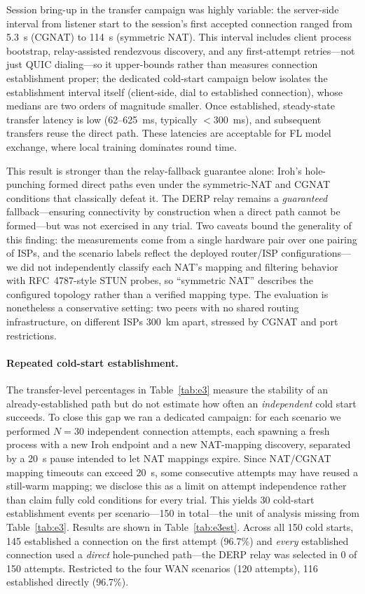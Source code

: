 ﻿\documentclass[journal]{IEEEtran}
\begin{document}
Session bring-up in the transfer campaign was highly variable: the server-side interval from listener start to the session's first accepted connection ranged from 5.3~s (CGNAT) to 114~s (symmetric NAT). This interval includes client process bootstrap, relay-assisted rendezvous discovery, and any first-attempt retries---not just QUIC dialing---so it upper-bounds rather than measures connection establishment proper; the dedicated cold-start campaign below isolates the establishment interval itself (client-side, dial to established connection), whose medians are two orders of magnitude smaller. Once established, steady-state transfer latency is low (62--625~ms, typically $<$300~ms), and subsequent transfers reuse the direct path. These latencies are acceptable for FL model exchange, where local training dominates round time.

This result is stronger than the relay-fallback guarantee alone: Iroh's hole-punching formed direct paths even under the symmetric-NAT and CGNAT conditions that classically defeat it. The DERP relay remains a \emph{guaranteed} fallback---ensuring connectivity by construction when a direct path cannot be formed---but was not exercised in any trial. Two caveats bound the generality of this finding: the measurements come from a single hardware pair over one pairing of ISPs, and the scenario labels reflect the deployed router/ISP configurations---we did not independently classify each NAT's mapping and filtering behavior with RFC~4787-style STUN probes, so ``symmetric NAT'' describes the configured topology rather than a verified mapping type. The evaluation is nonetheless a conservative setting: two peers with no shared routing infrastructure, on different ISPs 300~km apart, stressed by CGNAT and port restrictions.

\paragraph{Repeated cold-start establishment.}
The transfer-level percentages in Table~\ref{tab:e3} measure the stability of an already-established path but do not estimate how often an \emph{independent} cold start succeeds. To close this gap we ran a dedicated campaign: for each scenario we performed $N{=}30$ independent connection attempts, each spawning a fresh process with a new Iroh endpoint and a new NAT-mapping discovery, separated by a 20~s pause intended to let NAT mappings expire. Since NAT/CGNAT mapping timeouts can exceed 20~s, some consecutive attempts may have reused a still-warm mapping; we disclose this as a limit on attempt independence rather than claim fully cold conditions for every trial. This yields 30 cold-start establishment events per scenario---150 in total---the unit of analysis missing from Table~\ref{tab:e3}. Results are shown in Table~\ref{tab:e3est}. Across all 150 cold starts, 145 established a connection on the first attempt (96.7\%) and \emph{every} established connection used a \emph{direct} hole-punched path---the DERP relay was selected in 0 of 150 attempts. Restricted to the four WAN scenarios (120 attempts), 116 established directly (96.7\%).
\end{document}
